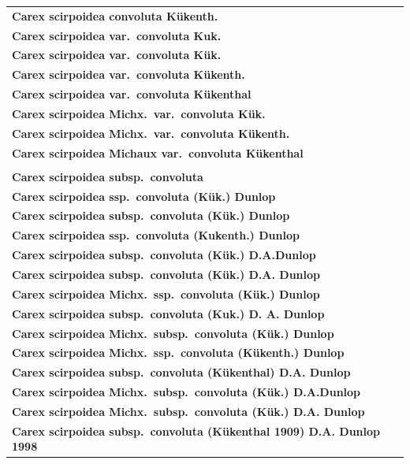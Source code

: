 \documentclass{bmcart}
\begin{document}
\begin{table}[!htb]
\begin{center}
\begin{tabular}{| l | c |}
    \textbf{Carex scirpoidea convoluta Kükenth.} & \\
    \textbf{Carex scirpoidea var.\ convoluta Kuk.} & \\
    \textbf{Carex scirpoidea var.\ convoluta Kük.} & \\
    \textbf{Carex scirpoidea var.\ convoluta Kükenth.} & \\
    \textbf{Carex scirpoidea var.\ convoluta Kükenthal} & \\
    \textbf{Carex scirpoidea Michx.\ var.\ convoluta Kük.} & \\
    \textbf{Carex scirpoidea Michx.\ var.\ convoluta Kükenth.} & \\
    \textbf{Carex scirpoidea Michaux var.\ convoluta Kükenthal} & \\
    & \\
    \textbf{Carex scirpoidea subsp.\ convoluta} & \\
    \textbf{Carex scirpoidea ssp.\ convoluta (Kük.) Dunlop} & \\
    \textbf{Carex scirpoidea subsp.\ convoluta (Kük.) Dunlop} & \\
    \textbf{Carex scirpoidea ssp.\ convoluta (Kukenth.) Dunlop} & \\
    \textbf{Carex scirpoidea subsp.\ convoluta (Kük.) D.A.Dunlop} & \\
    \textbf{Carex scirpoidea subsp.\ convoluta (Kük.) D.A. Dunlop} & \\
    \textbf{Carex scirpoidea Michx.\ ssp.\ convoluta (Kük.) Dunlop} & \\
    \textbf{Carex scirpoidea subsp.\ convoluta (Kuk.) D. A. Dunlop} & \\
    \textbf{Carex scirpoidea Michx.\ subsp.\ convoluta (Kük.) Dunlop} & \\
    \textbf{Carex scirpoidea Michx.\ ssp.\ convoluta (Kükenth.) Dunlop} & \\
    \textbf{Carex scirpoidea subsp.\ convoluta (Kükenthal) D.A. Dunlop} & \\
    \textbf{Carex scirpoidea Michx.\ subsp.\ convoluta (Kük.) D.A.Dunlop} & \\
    \textbf{Carex scirpoidea Michx.\ subsp.\ convoluta (Kük.) D.A. Dunlop} & \\
    \textbf{Carex scirpoidea subsp.\ convoluta (Kükenthal 1909) D.A. Dunlop 1998} & \\
    \hline
    \end{tabular}
  \end{center}
\end{table}
\end{document}
